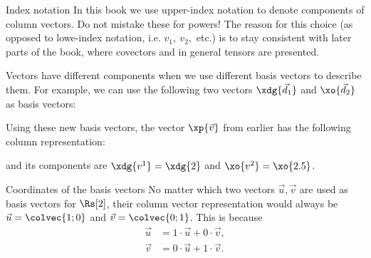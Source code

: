 \begin{note}{Index notation}{}
  In this book we use upper-index notation to denote components of column vectors. Do not mistake these for powers! The reason for this choice (as opposed to lowe-index notation, i.e. $v_{1},\ v_{2},$ etc.) is to stay consistent with later parts of the book, where covectors and in general tensors are presented.
\end{note}

Vectors have different components when we use different basis vectors to describe them. For example, we can use the following two vectors $\xdg{\vec{d}_{1}}$ and $\xo{\vec{d}_{2}}$ as basis vectors:

\begin{center}
\end{center}

Using these new basis vectors, the vector $\xp{\vec{v}}$ from earlier has the following column representation:

\vspace{-1.2em}
\begin{center}
\end{center}
and its components are $\xdg{v^{1}}=\xdg{2}$ and $\xo{v^{2}}=\xo{2.5}$.

\begin{note}{Coordinates of the basis vectors}{}
  No matter which two vectors $\vec{u}, \vec{v}$ are used as basis vectors for $\Rs[2]$, their column vector representation would always be $\vec{u}=\colvec{1;0}$ and $\vec{v}=\colvec{0;1}$. This is because
  \begin{align*}
    \vec{u} &= 1\cdot\vec{u}+ 0\cdot\vec{v},\\
    \vec{v} &= 0\cdot\vec{u} + 1\cdot\vec{v}.
  \end{align*}
\end{note}

